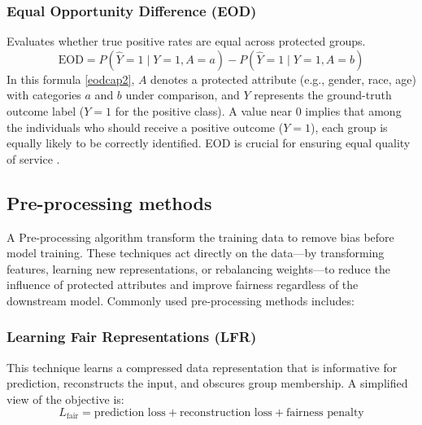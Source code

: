 \documentclass[12pt,a4paper,openright,twoside]{book}
\begin{document}
\subsubsection{Equal Opportunity Difference (EOD)}
Evaluates whether true positive rates are equal across protected groups.
\begin{equation}
    \text{EOD} = P(\hat{Y}=1 \mid Y=1, A=a) - P(\hat{Y}=1 \mid Y=1, A=b)
    \label{eodcap2}
\end{equation}
In this formula \ref{eodcap2}, $A$ denotes a protected attribute (e.g., gender, race, age) with categories $a$ and $b$ under comparison, and $Y$ represents the ground-truth outcome label ($Y=1$ for the positive class).  
A value near 0 implies that among the individuals who should receive a positive outcome ($Y=1$), each group is equally likely to be correctly identified. EOD is crucial for ensuring equal quality of service \cite{hardt2016equalityopportunitysupervisedlearning}.


\subsection{Pre-processing methods} 
A Pre-processing algorithm transform the training data to remove bias before model training. These techniques act directly on the data—by transforming features, learning new representations, or rebalancing weights—to reduce the influence of protected attributes and improve fairness regardless of the downstream model. Commonly used pre-processing methods includes:

\subsubsection{Learning Fair Representations (LFR)} This technique learns a compressed data representation that is informative for prediction, reconstructs the input, and obscures group membership.
A simplified view of the objective is:
\begin{equation}
    {L}_{\text{fair}} = \text{prediction loss} + \text{reconstruction loss} + \text{fairness penalty}
\end{equation}
\end{document}

